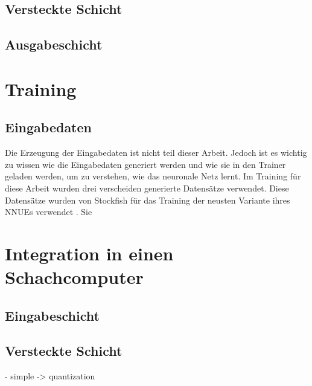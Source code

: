 
\subsection{Versteckte Schicht}
\subsection{Ausgabeschicht}


\section{Training}

\subsection{Eingabedaten}

Die Erzeugung der Eingabedaten ist nicht teil dieser Arbeit. Jedoch ist es wichtig zu wissen wie die Eingabedaten generiert werden und wie sie in den Trainer geladen werden, um zu verstehen, wie das neuronale Netz lernt. Im Training für diese Arbeit wurden drei verscheiden generierte Datensätze verwendet. Diese Datensätze wurden von Stockfish für das Training der neusten Variante ihres \acp{NNUE} verwendet \cite{StockfishNewestNetJul04}. Sie 




\section{Integration in einen Schachcomputer}

\subsection{Eingabeschicht}


\subsection{Versteckte Schicht}
- simple -> quantization